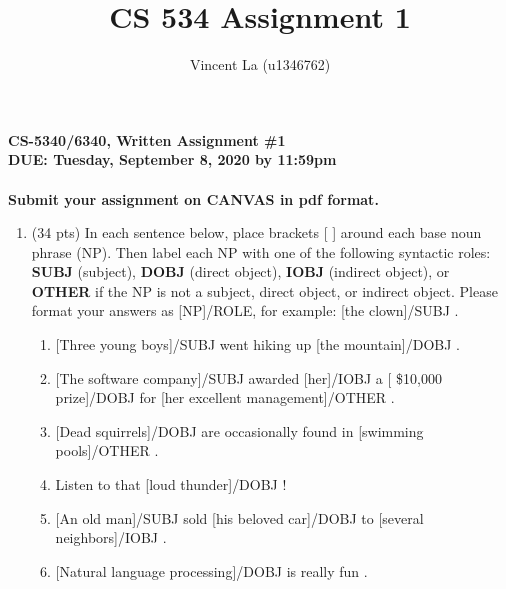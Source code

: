 \documentclass[11pt]{article}
\begin{document}
\author{Vincent La (u1346762)}

\title{CS 534 Assignment 1}
\maketitle

\large
\begin{center}
{\bf CS-5340/6340, Written Assignment \#1} \\
{\bf DUE: Tuesday, September 8, 2020 by 11:59pm} \\ ~ \\
{\bf  Submit your assignment on CANVAS in pdf format.}
\end{center}
\normalsize

\begin{enumerate}  


\item (34 pts) In each sentence below, place brackets [ ] around each base
  noun phrase (NP). Then label each NP with one of the following
  syntactic roles: {\bf SUBJ} (subject), {\bf DOBJ} (direct object),
  {\bf IOBJ} (indirect object), or {\bf OTHER} if the NP is not a
  subject, direct object, or indirect object. Please format your
  answers as [NP]/ROLE, for example: [the clown]/SUBJ .

  \begin{enumerate}

  \item {[Three young boys]}/SUBJ went hiking up {[the mountain]}/DOBJ . 

  \item {[The software company]}/SUBJ awarded {[her]}/IOBJ a {[ \$10,000 prize]}/DOBJ for {[her excellent management]}/OTHER .  


  \item {[Dead squirrels]}/DOBJ are occasionally found in {[swimming pools]}/OTHER .

  \item Listen to that {[loud thunder]}/DOBJ !
    
 \item {[An old man]}/SUBJ sold {[his beloved car]}/DOBJ to {[several neighbors]}/IOBJ . 

  \item {[Natural language processing]}/DOBJ is really fun .


\end{enumerate}
\end{enumerate}
\end{document}
